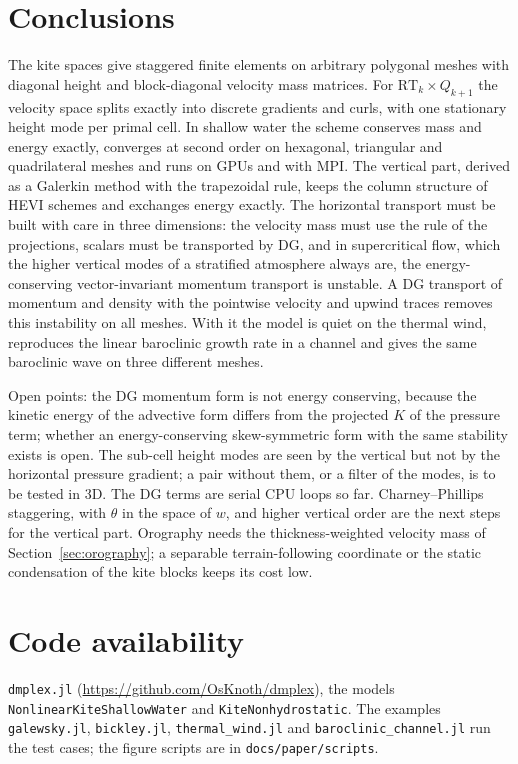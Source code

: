 \documentclass[preprint,12pt]{elsarticle}
\newcommand{\code}[1]{\texttt{#1}}
\theoremstyle{definition}
\begin{document}
\section{Conclusions}\label{sec:conclusions}

The kite spaces give staggered finite elements on arbitrary polygonal meshes with diagonal height and
block-diagonal velocity mass matrices. For $\mathrm{RT}_k\times Q_{k+1}$ the velocity space splits exactly
into discrete gradients and curls, with one stationary height mode per primal cell. In shallow water the
scheme conserves mass and energy exactly, converges at second order on hexagonal, triangular and
quadrilateral meshes and runs on GPUs and with MPI. The vertical part, derived as a Galerkin method with the
trapezoidal rule, keeps the column structure of HEVI schemes and exchanges energy exactly. The horizontal
transport must be built with care in three dimensions: the velocity mass must use the rule of the projections,
scalars must be transported by DG, and in supercritical flow, which the higher vertical modes of a stratified
atmosphere always are, the energy-conserving vector-invariant momentum transport is unstable. A DG transport
of momentum and density with the pointwise velocity and upwind traces removes this instability on all
meshes. With it the model is quiet on the thermal wind, reproduces the linear baroclinic growth rate in a
channel and gives the same baroclinic wave on three different meshes.

Open points: the DG momentum form is not energy conserving, because the kinetic energy of the advective form
differs from the projected $K$ of the pressure term; whether an energy-conserving skew-symmetric form with the
same stability exists is open. The sub-cell height modes are seen by the vertical but not by the horizontal
pressure gradient; a pair without them, or a filter of the modes, is to be tested in 3D. The DG terms are
serial CPU loops so far. Charney--Phillips staggering, with $\theta$ in the space of $w$, and higher vertical
order are the next steps for the vertical part. Orography needs the thickness-weighted velocity mass of Section~\ref{sec:orography}; a
separable terrain-following coordinate or the static condensation of the kite blocks keeps its cost low.

\section*{Code availability}
{\sloppy
\code{dmplex.jl} (\url{https://github.com/OsKnoth/dmplex}), the models \code{NonlinearKiteShallowWater} and
\code{KiteNonhydrostatic}. The examples \code{galewsky.jl}, \code{bickley.jl}, \code{thermal\_wind.jl} and
\code{baroclinic\_channel.jl} run the test cases; the figure scripts are in \code{docs/paper/scripts}.\par}
\end{document}
